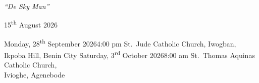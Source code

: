 

\vspace*{\fill}

\begin{center}
  {\coverface\fontsize{9}{10}\selectfont\color{primary!78}
  \par}

  \vspace{2.5mm}
  {\coverlight\fontsize{24}{27}\selectfont\color{primary}
  \par}

  \vspace{1.5mm}
  {\coverdisplay\itshape\fontsize{12.5}{15}\selectfont\color{accent}
  ``De Sky Man''\par}

  \vspace{8mm}

  {15\textsuperscript{th} August 2026}

  \vspace{3.2mm}
  \coverservices
  {%
    {Monday, 28\textsuperscript{th} September 2026}{4:00 pm}%
  {St.\ Jude Catholic Church, Iwogban,\\ Ikpoba Hill, Benin City}}
  {%
    {Saturday, 3\textsuperscript{rd} October 2026}{8:00 am}%
  {St.\ Thomas Aquinas Catholic Church,\\ Ivioghe, Agenebode}}
\end{center}

\vspace*{2mm}
